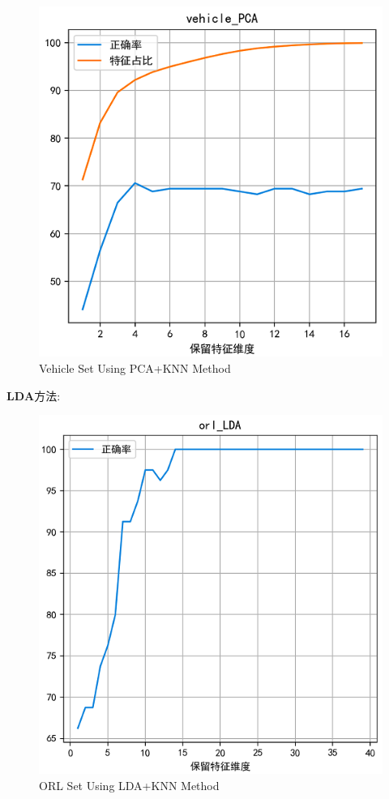 \documentclass[homework]{IEEEtran}
\begin{document}
\begin{CJK}{UTF8}{gkai}
\begin{figure}[htb]
    \centerline{\includegraphics{Images/fig2.png}}
    \caption{Vehicle Set Using PCA+KNN Method}
    \label{fig2}
    \end{figure} \par
$\mathbf{LDA}$方法:
\begin{figure}[htb]
    \centerline{\includegraphics{Images/fig3.png}}
    \caption{ORL Set Using LDA+KNN Method}
    \label{fig3}
    \end{figure}


\end{CJK}
\end{document}
